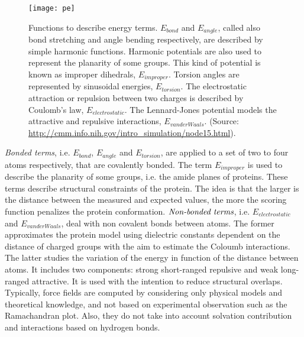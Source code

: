 \begin{figure}[tb]
	\begin{center}
		\texttt{[image: pe]}
		\caption[Functions to describe energy terms]{Functions to describe energy terms. $E_{bond}$ and $E_{angle}$, called also bond stretching and angle bending respectively, are described by simple harmonic functions. Harmonic potentials are also used to represent the planarity of some groups. This kind of potential is known as improper dihedrals, $E_{improper}$. Torsion angles are represented by sinusoidal energies, $E_{torsion}.$ The electrostatic attraction or repulsion between two charges is described by Coulomb's law, $E_{electrostatic}$. The Lennard-Jones potential models the attractive and repulsive interactions, $E_{vanderWaals}$. (Source: \href{http://cmm.info.nih.gov/intro\_simulation/node15.html}{http://cmm.info.nih.gov/intro\_simulation/node15.html}).}
		\label{fig:potential_energy}
	\end{center}
\end{figure}
\emph{Bonded terms}, i.e. $E_{bond}$, $E_{angle}$ and $E_{torsion}$, are applied to a set of two to four atoms respectively, that are covalently bonded. The term $E_{improper}$ is used to describe the planarity of some groups, i.e. the amide planes of proteins. These terms describe structural constraints of the protein. The idea is that the larger is the distance between the measured and expected values, the more the scoring function penalizes the protein conformation.
$\emph{Non-bonded terms}$, i.e. $E_{electrostatic}$ and $E_{vanderWaals}$, deal with non covalent bonds between atoms. The former approximates the protein model using dielectric constants dependent on the distance of charged groups with the aim to estimate the Coloumb interactions. The latter studies the variation of the energy in function of the distance between atoms. It includes two components: strong short-ranged repulsive and weak long-ranged attractive. It is used with the intention to reduce structural overlaps. Typically, force fields are computed by considering only physical models and theoretical knowledge, and not based on experimental observation such as the Ramachandran plot. Also, they do not take into account solvation contribution and interactions based on hydrogen bonds.



